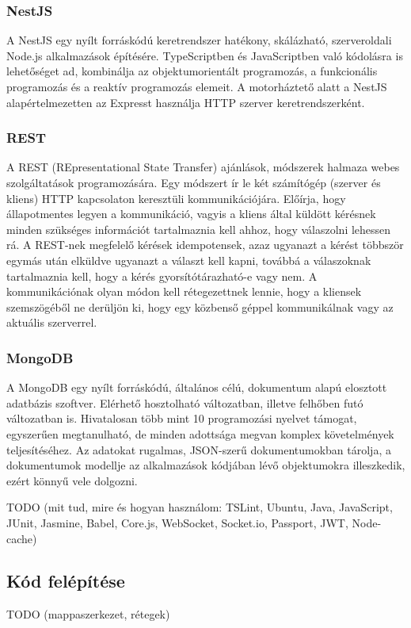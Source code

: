\documentclass{elteikthesis}
\begin{document}
				\subsubsection{NestJS}
					A NestJS \cite{nestjs} egy nyílt forráskódú keretrendszer hatékony, skálázható, szerveroldali Node.js alkalmazások építésére. TypeScriptben és JavaScriptben való kódolásra is lehetőséget ad, kombinálja az objektumorientált programozás, a funkcionális programozás és a reaktív programozás elemeit. A motorháztető alatt a NestJS alapértelmezetten az Expresst használja HTTP szerver keretrendszerként.
				
				\subsubsection{REST}
					A REST (REpresentational State Transfer) \cite{rest} ajánlások, módszerek halmaza webes szolgáltatások programozására. Egy módszert ír le két számítógép (szerver és kliens) HTTP kapcsolaton keresztüli kommunikációjára. Előírja, hogy állapotmentes legyen a kommunikáció, vagyis a kliens által küldött kérésnek minden szükséges információt tartalmaznia kell ahhoz, hogy válaszolni lehessen rá. A REST-nek megfelelő kérések idempotensek, azaz ugyanazt a kérést többször egymás után elküldve ugyanazt a választ kell kapni, továbbá a válaszoknak tartalmaznia kell, hogy a kérés gyorsítótárazható-e vagy nem. A kommunikációnak olyan módon kell rétegezettnek lennie, hogy a kliensek szemszögéből ne derüljön ki, hogy egy közbenső géppel kommunikálnak vagy az aktuális szerverrel.
				
				\subsubsection{MongoDB}
					A MongoDB \cite{mongodb} egy nyílt forráskódú, általános célú, dokumentum alapú elosztott adatbázis szoftver. Elérhető hosztolható változatban, illetve felhőben futó változatban is. Hivatalosan több mint 10 programozási nyelvet támogat, egyszerűen megtanulható, de minden adottsága megvan komplex követelmények teljesítéséhez. Az adatokat rugalmas, JSON-szerű dokumentumokban tárolja, a dokumentumok modellje az alkalmazások kódjában lévő objektumokra illeszkedik, ezért könnyű vele dolgozni.

			TODO (mit tud, mire és hogyan használom: TSLint, Ubuntu, Java, JavaScript, JUnit, Jasmine, Babel, Core.js, WebSocket, Socket.io, Passport, JWT, Node-cache)
			
			\subsection{Kód felépítése}
			TODO (mappaszerkezet, rétegek)
		
\end{document}
